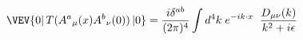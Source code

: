 \begin{equation}
\VEV{0|\,T({A^{a}}_{\mu}(x){A^{b}}_{\nu}(0))\,|0} ={{i\delta^{ab}}
\over {(2\pi)^{4}}} \int d^{4}k \;e^{-ik\cdot x} \; \;
{D_{\mu\nu}(k)\over {k^{2}+i\epsilon}}
\end{equation}

